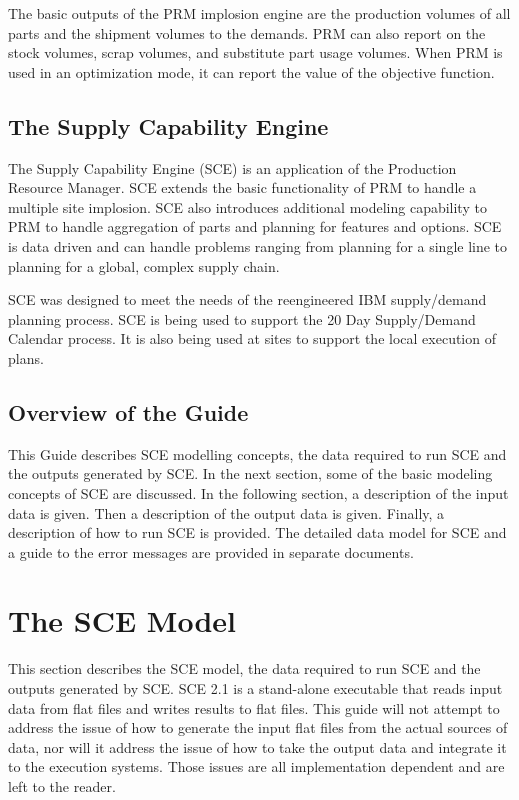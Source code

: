The basic outputs of the PRM implosion engine are the production
volumes of all parts and the shipment volumes to the demands.  PRM can
also report on the stock volumes, scrap volumes, and substitute part
usage volumes.  When PRM is used in an optimization mode, it can
report the value of the objective function.

\subsection{The Supply Capability Engine}
The Supply Capability Engine (SCE) is an application of the Production
Resource Manager.  SCE extends the basic functionality of PRM to
handle a multiple site implosion.  SCE also introduces additional
modeling capability to PRM to handle aggregation of parts and planning
for features and options.  SCE is data driven and can handle problems
ranging from planning for a single line to planning for a global,
complex supply chain.

SCE was designed to meet the needs of the reengineered IBM
supply/demand planning process.  SCE is being used to support the 20
Day Supply/Demand Calendar process.  It is also being used at sites to
support the local execution of plans.

\subsection{Overview of the Guide}
This Guide describes SCE modelling concepts, the data required to run
SCE and the outputs generated by SCE.  In the next section, some of
the basic modeling concepts of SCE are discussed.  In the following
section, a description of the input data is given.  Then a description
of the output data is given.  Finally, a description of how to run SCE
is provided.  The detailed data model for SCE and a guide to the error
messages are provided in separate documents.

\section{The SCE Model}
This section describes the SCE model, the data required to run SCE and
the outputs generated by SCE. SCE 2.1 is a stand-alone executable that
reads input data from flat files and writes results to flat files.
This guide will not attempt to address the issue of how to generate
the input flat files from the actual sources of data, nor will it
address the issue of how to take the output data and integrate it to
the execution systems.  Those issues are all implementation dependent
and are left to the reader.

